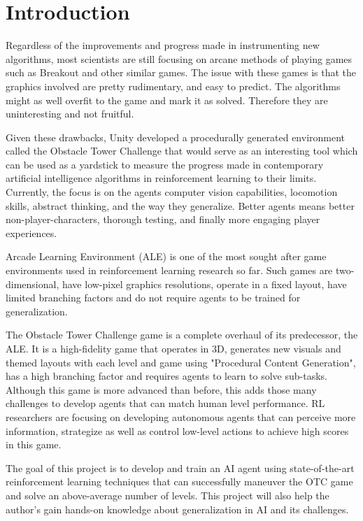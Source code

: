 \documentclass[conference]{IEEEtran}
\begin{document}
\section{Introduction}
Regardless of the improvements and progress made in instrumenting new algorithms, most scientists are still focusing on arcane methods of playing games such as Breakout and other similar games. The issue with these games is that the graphics involved are pretty rudimentary, and easy to predict. The algorithms might as well overfit to the game and mark it as solved. Therefore they are uninteresting and not fruitful.

Given these drawbacks, Unity developed a procedurally generated environment called the Obstacle Tower Challenge \cite{Juliani-et-al} that would serve as an interesting tool which can be used as a yardstick to measure the progress made in contemporary artificial intelligence algorithms in reinforcement learning to their limits. Currently, the focus is on the agents computer vision capabilities, locomotion skills, abstract thinking, and the way they generalize. Better agents means better non-player-characters, thorough testing, and finally more engaging player experiences.

Arcade Learning Environment (ALE) is one of the most sought after game environments used in reinforcement learning research \cite{Bellemare-et-al}\cite{Mnih-2015} so far. Such games are two-dimensional, have low-pixel graphics resolutions, operate in a fixed layout, have limited branching factors and do not require agents to be trained for generalization.

The Obstacle Tower Challenge game is a complete overhaul of its predecessor, the ALE. It is a high-fidelity game that operates in 3D, generates new visuals and themed layouts with each level and game using "Procedural Content Generation", has a high branching factor and requires agents to learn to solve sub-tasks. Although this game is more advanced than before, this adds those many challenges to develop agents that can match human level performance. RL researchers are focusing on developing autonomous agents that can perceive more information, strategize as well as control low-level actions to achieve high scores in this game.

The goal of this project is to develop and train an AI agent using state-of-the-art reinforcement learning techniques that can successfully maneuver the OTC game and solve an above-average number of levels. This project will also help the author's gain hands-on knowledge about generalization in AI and its challenges.
\end{document}

